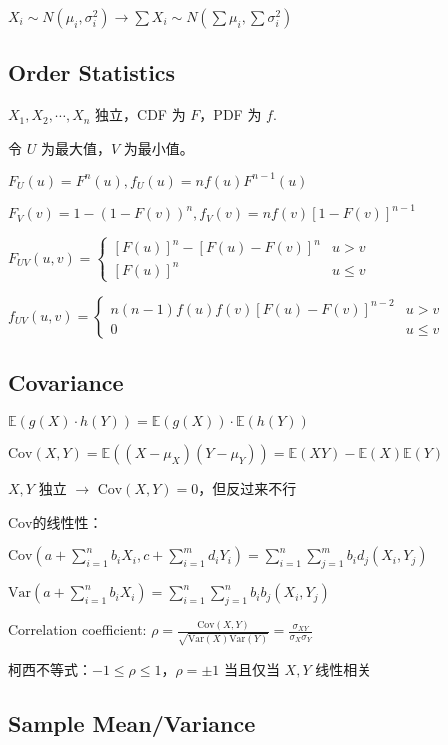 \documentclass[9pt,landscape]{article}
\begin{document}
\begin{multicols}{3}
$X_i\sim N(\mu_i,\sigma_i^2)\to \sum X_i\sim N(\sum\mu_i,\sum\sigma_i^2)$

\subsection{Order Statistics}

$X_1, X_2, \cdots, X_n$ 独立，CDF 为 $F$，PDF 为 $f$.

令 $U$ 为最大值，$V$ 为最小值。

$F_U(u)=F^n(u), f_U(u)=nf(u)F^{n-1}(u)$ 

$F_V(v)=1-\left(1-F(v)\right)^n, f_V(v)=nf(v)\left[1-F(v)\right]^{n-1}$

$F_{UV}(u, v)=\begin{cases}
	\left[F(u)\right]^n-\left[F(u)-F(v)\right]^{n}&u>v\\
	\left[F(u)\right]^n&u\le v
\end{cases}$

$f_{UV}(u, v)=\begin{cases}
	n(n-1)f(u)f(v)\left[F(u)-F(v)\right]^{n-2}&u> v\\
	0&u\le v
\end{cases}$

\subsection{Covariance}

$\mathbb{E}(g(X)\cdot h(Y))=\mathbb{E}(g(X))\cdot \mathbb{E}(h(Y))$

$\mathrm{Cov}(X, Y)=\mathbb{E}((X-\mu_X)(Y-\mu_Y))=\mathbb{E}(XY)-\mathbb{E}(X)\mathbb{E}(Y)$

$X, Y$ 独立 $\to$ $\mathrm{Cov}(X, Y)=0$，但反过来不行

$\mathrm{Cov}$的线性性：

$\mathrm{Cov}\left(a+\sum_{i=1}^{n}b_iX_i, c+\sum_{i=1}^{m}d_iY_i\right)=\sum_{i=1}^{n}\sum_{j=1}^{m}b_id_j(X_i, Y_j)$

$\mathrm{Var}\left(a+\sum_{i=1}^{n}b_iX_i\right)=\sum_{i=1}^{n}\sum_{j=1}^{n}b_ib_j(X_i, Y_j)$

Correlation coefficient: $\rho=\frac{\mathrm{Cov}(X, Y)}{\sqrt{\mathrm{Var}(X)\mathrm{Var}(Y)}}=\frac{\sigma_{XY}}{\sigma_X\sigma_Y}$

柯西不等式：$-1\le\rho\le 1$，$\rho=\pm 1$ 当且仅当 $X, Y$ 线性相关

\subsection{Sample Mean/Variance}


\end{multicols}
\end{document}
